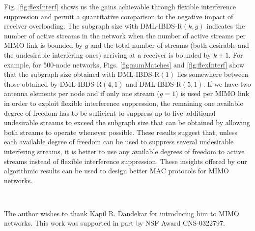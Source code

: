 \documentclass[journal,12pt,onecolumn]{IEEEtran}
\begin{document}
Fig.\,\,\ref{fig:flexInterf} shows us the gains achievable through
flexible interference suppression and permit a quantitative comparison to the
negative impact of receiver overloading. The subgraph size with
DML-IBDS-R$(k,g)$ indicates the number of active streams in the
network when the number of active streams per MIMO link is bounded by
$g$ and the total number of streams (both desirable and the undesirable
interfering ones) arriving at a receiver is bounded by $k+1$. For example, for 500-node networks,
Figs.\,\,\ref{fig:numMatches} and \ref{fig:flexInterf} show that the
subgraph size obtained with DML-IBDS-R$(1)$ 
lies somewhere between those obtained by DML-IBDS-R$(4,1)$ and
DML-IBDS-R$(5,1)$. If we have two antenna elements per node and if only
one stream ($g=1$) is used per MIMO link in order to exploit flexible
interference suppression, the remaining one available degree of freedom has to be 
sufficient to suppress up to five additional undesirable streams to exceed
the subgraph size that can be obtained by allowing both streams to
operate whenever possible. These results suggest that, unless each
available degree of freedom can be used to suppress several undesirable
interfering streams, it is better to use any available degrees of
freedom to active streams instead of flexible interference suppression.
These insights offered by our algorithmic results can be used to design
better MAC protocols for MIMO networks.

~\\

The author wishes to thank Kapil R. Dandekar for introducing him to MIMO networks.
This work was supported in part by NSF Award CNS-0322797.




\end{document}
